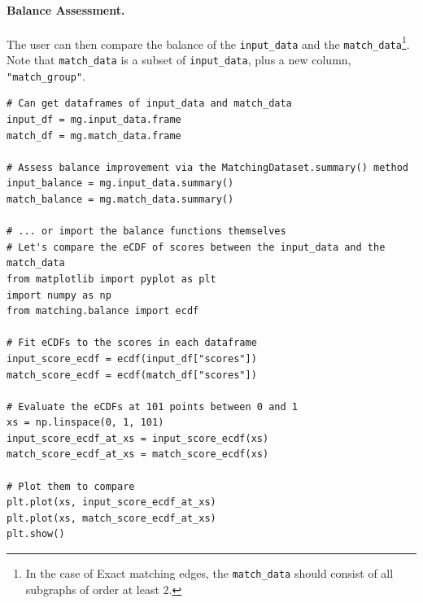 \documentclass[11pt]{extarticle}
\begin{document}
\paragraph{Balance Assessment.} The user can then compare the balance of the \texttt{input\_data} and the \texttt{match\_data}\footnote{In the case of Exact matching edges, the \texttt{match\_data} should consist of all subgraphs of order at least 2.}. Note that \texttt{match\_data} is a subset of \texttt{input\_data}, plus a new column, \texttt{"match\_group"}.
\begin{verbatim}
# Can get dataframes of input_data and match_data
input_df = mg.input_data.frame
match_df = mg.match_data.frame

# Assess balance improvement via the MatchingDataset.summary() method
input_balance = mg.input_data.summary()
match_balance = mg.match_data.summary()

# ... or import the balance functions themselves
# Let's compare the eCDF of scores between the input_data and the match_data
from matplotlib import pyplot as plt
import numpy as np
from matching.balance import ecdf

# Fit eCDFs to the scores in each dataframe
input_score_ecdf = ecdf(input_df["scores"])
match_score_ecdf = ecdf(match_df["scores"])

# Evaluate the eCDFs at 101 points between 0 and 1
xs = np.linspace(0, 1, 101)
input_score_ecdf_at_xs = input_score_ecdf(xs)
match_score_ecdf_at_xs = match_score_ecdf(xs)

# Plot them to compare
plt.plot(xs, input_score_ecdf_at_xs)
plt.plot(xs, match_score_ecdf_at_xs)
plt.show()
\end{verbatim}
\end{document}
